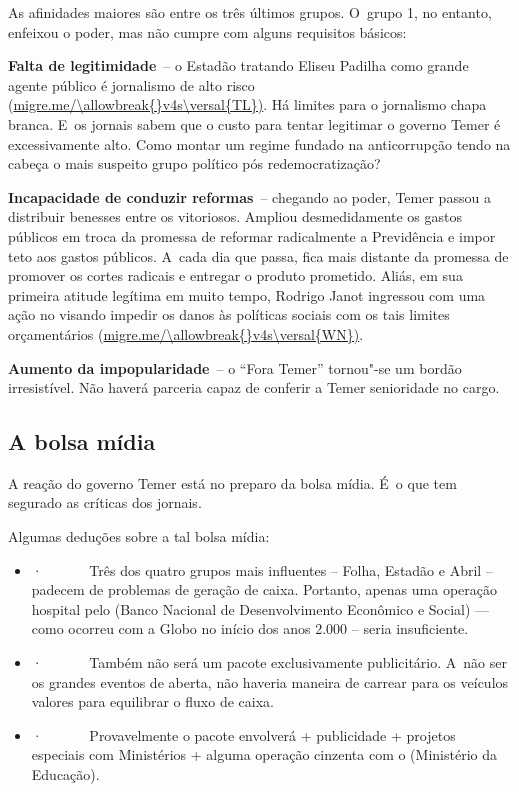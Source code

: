 As afinidades maiores são entre os três últimos grupos. O~grupo 1, no
entanto, enfeixou o poder, mas não cumpre com alguns requisitos básicos:

\textbf{Falta de legitimidade}~-- o Estadão tratando Eliseu Padilha como
grande agente público é jornalismo de alto risco
(\url{migre.me/\allowbreak{}v4s\versal{TL})}. Há limites para o jornalismo chapa
branca. E~os jornais sabem que o custo para tentar legitimar o governo
Temer é excessivamente alto. Como montar um regime fundado na
anticorrupção tendo na cabeça o mais suspeito grupo político pós
redemocratização?

\textbf{Incapacidade de conduzir reformas}~-- chegando ao poder, Temer
passou a distribuir benesses entre os vitoriosos. Ampliou desmedidamente
os gastos públicos em troca da promessa de reformar radicalmente a
Previdência e impor teto aos gastos públicos. A~cada dia que passa, fica
mais distante da promessa de promover os cortes radicais e entregar o
produto prometido. Aliás, em sua primeira atitude legítima em muito
tempo, Rodrigo Janot ingressou com uma ação no  visando impedir os
danos às políticas sociais com os tais limites orçamentários
(\url{migre.me/\allowbreak{}v4s\versal{WN})}.

\textbf{Aumento da impopularidade}~-- o ``Fora Temer'' tornou"-se um
bordão irresistível. Não haverá parceria capaz de conferir a Temer
senioridade no cargo.

\subsection{A bolsa mídia}

A reação do governo Temer está no preparo da bolsa mídia. É~o que tem
segurado as críticas dos jornais.

Algumas deduções sobre a tal bolsa mídia:

\begin{itemize}
\itemsep1pt\parskip0pt
\item
  ·~~~~~~ Três dos quatro grupos mais influentes -- Folha, Estadão e
  Abril -- padecem de problemas de geração de caixa. Portanto, apenas
  uma operação hospital pelo  (Banco Nacional de Desenvolvimento
  Econômico e Social) --- como ocorreu com a Globo no início dos anos
  2.000 -- seria insuficiente.
\item
  ·~~~~~~ Também não será um pacote exclusivamente publicitário. A~não
  ser os grandes eventos de  aberta, não haveria maneira de carrear
  para os veículos valores para equilibrar o fluxo de caixa.
\item
  ·~~~~~~ Provavelmente o pacote envolverá  + publicidade +
  projetos especiais com Ministérios + alguma operação cinzenta com o
   (Ministério da Educação).
\end{itemize}


